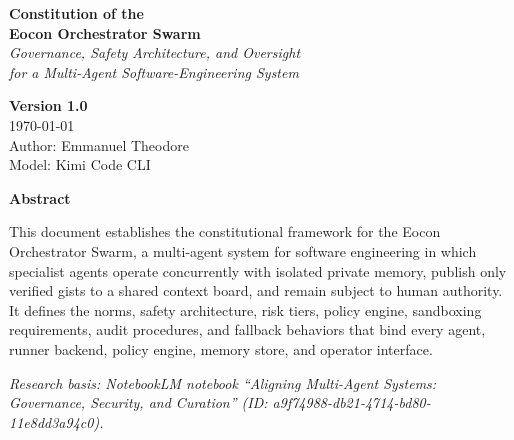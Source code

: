 \documentclass[12pt,letterpaper]{article}
\begin{document}
\begin{titlepage}
    \centering
    \vspace*{2cm}

    {\Huge\bfseries Constitution of the\\[0.3cm]
    Eocon Orchestrator Swarm}\\[0.5cm]
    {\Large\itshape Governance, Safety Architecture, and Oversight\\[0.3cm]
    for a Multi-Agent Software-Engineering System}\\[2cm]

    \vspace{1cm}

    {\large\bfseries Version 1.0}\\[0.3cm]
    {\large \today}\\[0.5cm]
    {\large Author: Emmanuel Theodore}\\[0.3cm]
    {\large Model: Kimi Code CLI}\\[2cm]

    \vfill

    {\large\bfseries Abstract}\\[0.5cm]
    \begin{tcolorbox}[colback=gray!10,colframe=primaryblue,width=0.9\textwidth]
    This document establishes the constitutional framework for the Eocon Orchestrator Swarm, a multi-agent system for software engineering in which specialist agents operate concurrently with isolated private memory, publish only verified gists to a shared context board, and remain subject to human authority. It defines the norms, safety architecture, risk tiers, policy engine, sandboxing requirements, audit procedures, and fallback behaviors that bind every agent, runner backend, policy engine, memory store, and operator interface.
    \end{tcolorbox}

    \vspace{1cm}

    {\small\textit{Research basis: NotebookLM notebook ``Aligning Multi-Agent Systems: Governance, Security, and Curation'' (ID: a9f74988-db21-4714-bd80-11e8dd3a94c0).}}

\end{titlepage}

\renewcommand{\contentsname}{Table of Contents}
\renewcommand{\cfttoctitlefont}{\huge\bfseries\color{primaryblue}}
\tableofcontents
\newpage
\end{document}

